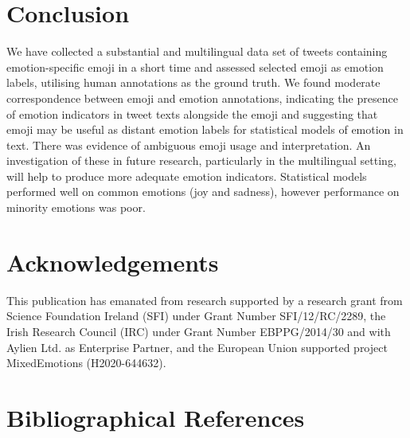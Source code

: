 \documentclass[10pt, a4paper]{article}
\begin{document}
\section{Conclusion}

We have collected a substantial and multilingual data set of tweets containing emotion-specific emoji in a short time and assessed selected emoji as emotion labels, utilising human annotations as the ground truth. We found moderate correspondence between emoji and emotion annotations, indicating the presence of emotion indicators in tweet texts alongside the emoji and suggesting that emoji may be useful as distant emotion labels for statistical models of emotion in text. There was evidence of ambiguous emoji usage and interpretation. An investigation of these in future research, particularly in the multilingual setting, will help to produce more adequate emotion indicators. Statistical models performed well on common emotions (joy and sadness), however performance on minority emotions was poor. 

\section*{Acknowledgements}

This publication has emanated from research supported by a research grant from Science Foundation Ireland (SFI) under Grant Number SFI/12/RC/2289,
the Irish Research Council (IRC) under Grant Number EBPPG/2014/30 and with Aylien Ltd. as Enterprise Partner, 
 and the European Union supported project MixedEmotions (H2020-644632).

\section{Bibliographical References}
\label{m%
%
%
ain:ref}


% 

\end{document}
